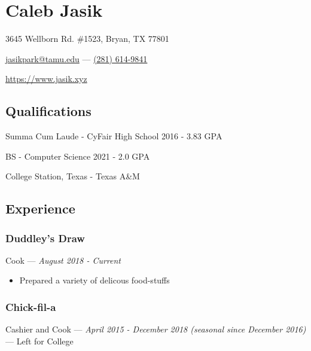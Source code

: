\documentclass[letterpaper,10pt]{article}
\begin{document}
\section{\Huge Caleb Jasik}

\hfill 3645 Wellborn Rd. \#1523, Bryan, TX 77801

\hfill \href{mailto:jasikpark@tamu.edu}{jasikpark@tamu.edu} ---
\href{tel:2816149841}{(281) 614-9841}

\hfill \href{https://jasik.xyz}{https://www.jasik.xyz}

\subsection{Qualifications}

Summa Cum Laude - CyFair High School 2016 - 3.83 GPA

BS - Computer Science 2021 - 2.0 GPA

College Station, Texas - Texas A\&M



\subsection{Experience}

\subsubsection{Duddley's Draw}
\hfill Cook --- \emph{August 2018 - Current}

\begin{itemize}
\tightlist{}
\item Prepared a variety of delicous food-stuffs
\end{itemize}


\subsubsection{Chick-fil-a}
\hfill Cashier and Cook --- \emph{April 2015 - December 2018 (seasonal since December 2016)} --- Left for College
\end{document}
